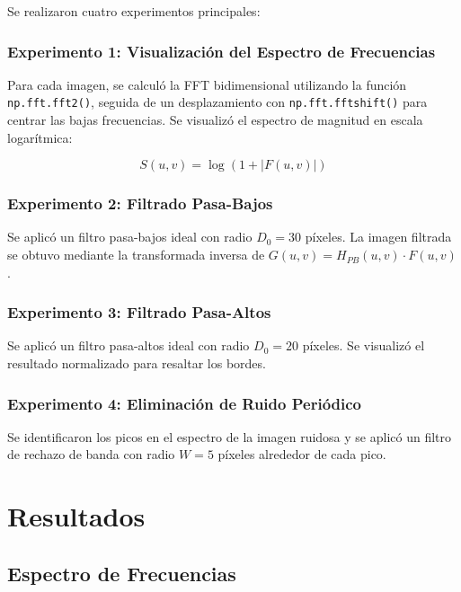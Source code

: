 \documentclass[conference]{IEEEtran}
\begin{document}
Se realizaron cuatro experimentos principales:

\subsubsection{Experimento 1: Visualización del Espectro de Frecuencias}

Para cada imagen, se calculó la FFT bidimensional utilizando la función \texttt{np.fft.fft2()}, seguida de un desplazamiento con \texttt{np.fft.fftshift()} para centrar las bajas frecuencias. Se visualizó el espectro de magnitud en escala logarítmica:

\begin{equation}
S(u,v) = \log(1 + |F(u,v)|)
\label{eq:espectro}
\end{equation}

\subsubsection{Experimento 2: Filtrado Pasa-Bajos}

Se aplicó un filtro pasa-bajos ideal con radio $D_0 = 30$ píxeles. La imagen filtrada se obtuvo mediante la transformada inversa de $G(u,v) = H_{PB}(u,v) \cdot F(u,v)$.

\subsubsection{Experimento 3: Filtrado Pasa-Altos}

Se aplicó un filtro pasa-altos ideal con radio $D_0 = 20$ píxeles. Se visualizó el resultado normalizado para resaltar los bordes.

\subsubsection{Experimento 4: Eliminación de Ruido Periódico}

Se identificaron los picos en el espectro de la imagen ruidosa y se aplicó un filtro de rechazo de banda con radio $W = 5$ píxeles alrededor de cada pico.
\hfill
\hfill
\section{Resultados}

\subsection{Espectro de Frecuencias}
\end{document}
